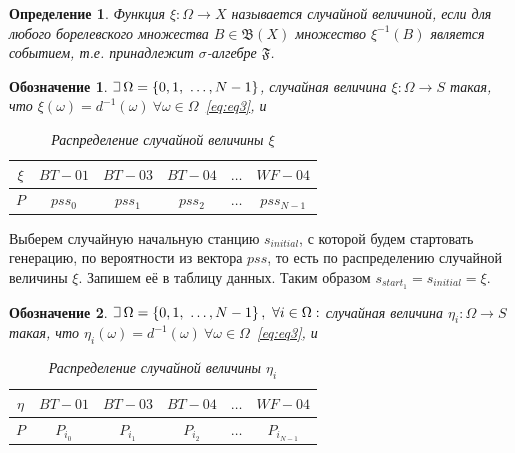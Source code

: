 \documentclass[specialist, substylefile = spbu_report.rtx, subf,href,colorlinks=true, 12pt]{disser}
\newtheorem{mydef}{Определение}
\newtheorem{designation}{Обозначение}
\def\letus{%
	\mathord{\setbox0=\hbox{$\exists$}%
		\hbox{\kern 0.125\wd0%
			\vbox to \ht0{%
				\hrule width 0.75\wd0%
				\vfill%
				\hrule width 0.75\wd0}%
			\vrule height \ht0%
			\kern 0.125\wd0}%
	}%
}
\begin{document}
\begin{mydef}\label{eq:eq3}
	Функция $\xi: \Omega \rightarrow X$ называется случайной величиной, если для любого борелевского множества $B \in \mathfrak{B}(X)$ множество $\xi^{-1}(B)$ является событием, т.е. принадлежит $\sigma$-алгебре $\mathfrak{F}$.
\end{mydef}
\begin{designation}
	$\letus \, \Omega = \left\{0, 1, \ \ldots, N-1\right\}$, случайная величина $\xi: \Omega \rightarrow S$ такая, что $\xi(\omega) = d^{-1}(\omega) \ \forall \omega \in \Omega$~\eqref{eq:eq3}, и\\
	\begin{table}[h]
		\begin{center}
			\begin{tabular}{|c|c|c|c|c|c|}
				\hline
				$\xi$	&	$BT\!-\!01$	&	$BT\!-\!03$	&	$BT\!-\!04$	&	$\ldots$	&	$WF\!-\!04$ \\ \hline
				$P$	&	$pss_0$	&	$pss_1$	&	$pss_2$	&	$\ldots$	&	$pss_{N-1}$ \\ \hline
			\end{tabular}
		\end{center}
		\caption{Распределение случайной величины $\xi$}\label{table:table1}
	\end{table}
\end{designation}

Выберем случайную начальную станцию $s_{initial}$, с которой будем стартовать генерацию, по вероятности из вектора $pss$, то есть по распределению случайной величины $\xi$. Запишем её в таблицу данных. Таким образом $s_{start_1} = s_{initial} = \xi$.

\begin{designation}
	$\letus \, \Omega = \left\{0, 1, \ \ldots, N-1\right\}, \ \forall i \in \Omega:$ случайная величина $\eta_i: \Omega \rightarrow S$ такая, что $\eta_i(\omega) = d^{-1}(\omega) \ \forall \omega \in \Omega$~\eqref{eq:eq3}, и
	\begin{table}[h]
		\begin{center}
			\begin{tabular}{|c|c|c|c|c|c|}
				\hline
				$\eta$	&	$BT\!-\!01$	&	$BT\!-\!03$	&	$BT\!-\!04$	&	$\ldots$	&	$WF\!-\!04$ \\ \hline
				$P$	&	$P_{i_0}$	&	$P_{i_1}$	&	$P_{i_2}$	&	$\ldots$	&	$P_{i_{N-1}}$ \\ \hline
			\end{tabular}
		\end{center}
		\caption{Распределение случайной величины $\eta_i$}\label{table:table1}
	\end{table}
\end{designation}
\end{document}
